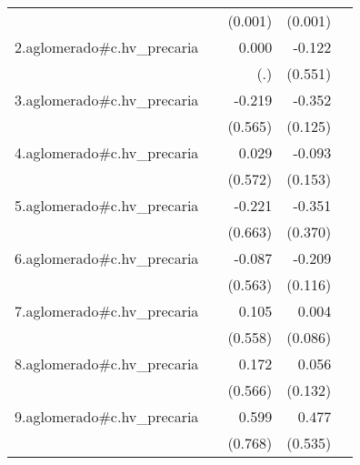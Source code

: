 {\begin{longtable}{l*{4}{D{.}{.}{-1}}}
            &                     &     (0.001)         &     (0.001)         &                     \\
\addlinespace
2.aglomerado#c.hv\_precaria&                     &       0.000         &      -0.122         &                     \\
            &                     &         (.)         &     (0.551)         &                     \\
\addlinespace
3.aglomerado#c.hv\_precaria&                     &      -0.219         &      -0.352\sym{**} &                     \\
            &                     &     (0.565)         &     (0.125)         &                     \\
\addlinespace
4.aglomerado#c.hv\_precaria&                     &       0.029         &      -0.093         &                     \\
            &                     &     (0.572)         &     (0.153)         &                     \\
\addlinespace
5.aglomerado#c.hv\_precaria&                     &      -0.221         &      -0.351         &                     \\
            &                     &     (0.663)         &     (0.370)         &                     \\
\addlinespace
6.aglomerado#c.hv\_precaria&                     &      -0.087         &      -0.209         &                     \\
            &                     &     (0.563)         &     (0.116)         &                     \\
\addlinespace
7.aglomerado#c.hv\_precaria&                     &       0.105         &       0.004         &                     \\
            &                     &     (0.558)         &     (0.086)         &                     \\
\addlinespace
8.aglomerado#c.hv\_precaria&                     &       0.172         &       0.056         &                     \\
            &                     &     (0.566)         &     (0.132)         &                     \\
\addlinespace
9.aglomerado#c.hv\_precaria&                     &       0.599         &       0.477         &                     \\
            &                     &     (0.768)         &     (0.535)         &                     \\

\end{longtable}}

